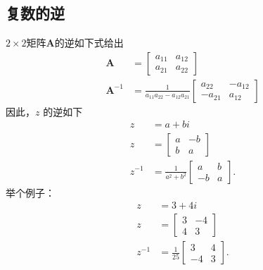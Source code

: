 \subsection{复数的逆}
$2 \times 2$矩阵$\mathbf{A}$的逆如下式给出
$$
  \begin{aligned}
    \mathbf{A}      & =\left[\begin{array}{ll}
        a_{11} & a_{12} \\
        a_{21} & a_{22}
      \end{array}\right]                                      \\
    \mathbf{A}^{-1} & =\frac{1}{a_{11} a_{22}-a_{12} a_{21}}\left[\begin{array}{cc}
        a_{22}  & -a_{12} \\
        -a_{21} & a_{12}
      \end{array}\right]
  \end{aligned}
$$
因此，$z$ 的逆如下
$$
  \begin{aligned}
    z      & =a+b i                                                          \\
    z      & =\left[\begin{array}{cc}
        a & -b \\
        b & a
      \end{array}\right]                        \\
    z^{-1} & =\frac{1}{a^{2}+b^{2}}\left[\begin{array}{cc}
        a  & b \\
        -b & a
      \end{array}\right] .
  \end{aligned}
$$
举个例子：
$$
  \begin{aligned}
    z      & =3+4 i                                                  \\
    z      & =\left[\begin{array}{cc}
        3 & -4 \\
        4 & 3
      \end{array}\right]               \\
    z^{-1} & =\frac{1}{25}\left[\begin{array}{cc}
        3  & 4 \\
        -4 & 3
      \end{array}\right] .
  \end{aligned}
$$

